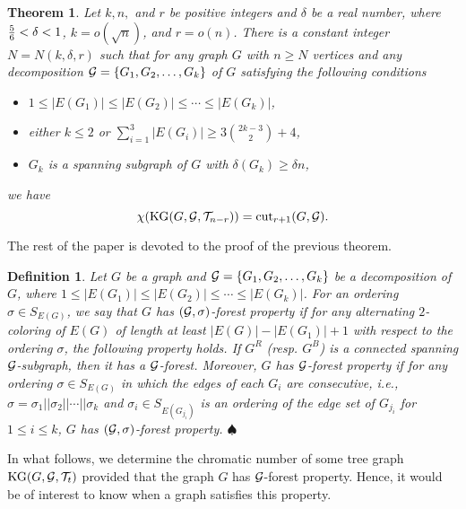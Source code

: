 \documentclass[11pt]{article}
\newtheorem{predefin}{{\bf Definition}}
\newenvironment{defin}[1]{\begin{predefin}{\hspace{-0.5
                   em}{\bf.\ }}{\rm #1}\hfill{$\spadesuit$}}{\end{predefin}}
\newtheorem{prethm}{{\bf Theorem}}
\newenvironment{thm}{\begin{prethm}{\hspace{-0.5
               em}{\bf.\ }}}{\end{prethm}}
\begin{document}
\begin{thm}\label{mainthm}
Let $k, n,$ and $r$ be positive integers and $\delta$ be a real number, where 
${5\over 6}< \delta < 1$, $k=o(\sqrt{n})$, and $r=o(n)$. There is a constant integer
$N=N(k,\delta,r)$ such that for any graph $G$ with $n\geq N$ vertices and any 
decomposition ${\cal G}=\{G_1,G_2,\ldots,G_k\}$  of  $G$ satisfying the following conditions
\begin{itemize}
\item $1\leq |E(G_1)|\leq |E(G_{2})|\leq \cdots\leq |E(G_k)|$,
\item either $k\leq 2$ or $\sum_{i=1}^3|E(G_i)|\geq 3{2k-3\choose 2}+4$, 
\item $G_k$ is a spanning subgraph of $G$ with $\delta(G_k)\geq \delta n$, 
\end{itemize}
we have
$$\chi({\rm KG}(G, {\cal G}, {\cal T}_{ n-r}))={\rm cut}_{r+1}(G, {\cal G}).$$
\end{thm}
The rest of the paper is devoted to the proof of the previous theorem. 
\begin{defin}{
Let $G$ be a graph and ${\cal G}=\{G_1,G_2,\ldots,G_k\}$ be a decomposition  of $G$, 
where $1\leq|E(G_1)|\leq |E(G_2)|\leq \cdots \leq |E(G_k)|$. 
For an ordering $\sigma \in S_{E(G)}$,
we say that $G$ has {\it $({\cal G},\sigma)$-forest property} if for any alternating $2$-coloring 
of $E(G)$  of length at least $|E(G)|-|E(G_1)|+1$ with respect to the ordering $\sigma$, 
the following property holds. 
If $G^R$ (resp.  $G^B$) is a connected spanning ${\cal G}$-subgraph, then it has a  ${\cal G}$-forest.
Moreover, $G$ has {\it ${\cal G}$-forest property} if for any ordering $\sigma \in S_{E(G)}$
in which the edges of each $G_i$ are consecutive, i.e., $\sigma=\sigma_1||\sigma_2||\cdots||\sigma_k$ and $\sigma_i \in S_{E(G_{j_i})}$ is an ordering of 
the edge set of $G_{j_i}$ for $1\leq i\leq k$,  
$G$ has $({\cal G},\sigma)$-forest property.
}\end{defin}
In what follows, we determine the chromatic number of some tree graph ${\rm KG}(G, {\cal G}, {\cal T}_t)$
provided that the graph $G$ has ${\cal G}$-forest property. Hence, it would be of interest to know when a graph satisfies 
this property. 
\end{document}
